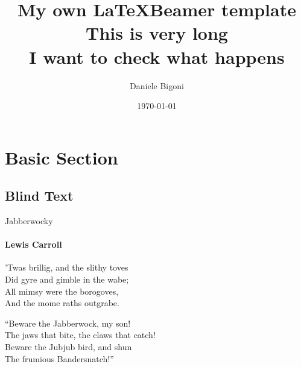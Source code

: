 \documentclass[aspectratio=169]{beamer}
\title{My own \LaTeX Beamer template \\ This is very long \\ I want to check what happens}
\date[\today]{\today}
\author[Bigoni]{Daniele Bigoni}
\begin{document}
\begin{frame}
\titlepage
\end{frame}

\section{Basic Section}
\subsection{Blind Text}
\begin{frame}{Jabberwocky}
    \framesubtitle{Lewis Carroll}%
    'Twas brillig, and the slithy toves\\
    Did gyre and gimble in the wabe;\\
    All mimsy were the borogoves,\\
    And the mome raths outgrabe.\\\bigskip

    “Beware the Jabberwock, my son!\\
    The jaws that bite, the claws that catch!\\
    Beware the Jubjub bird, and shun\\
    The frumious Bandersnatch!”\\
\end{frame}
\end{document}
